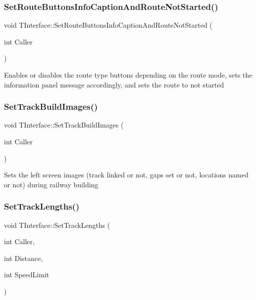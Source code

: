 \subsubsection{\texorpdfstring{Set\+Route\+Buttons\+Info\+Caption\+And\+Route\+Not\+Started()}{SetRouteButtonsInfoCaptionAndRouteNotStarted()}}
{\footnotesize\ttfamily void T\+Interface\+::\+Set\+Route\+Buttons\+Info\+Caption\+And\+Route\+Not\+Started (\begin{DoxyParamCaption}\item[{int}]{Caller }\end{DoxyParamCaption})\hspace{0.3cm}{\ttfamily [private]}}

Enables or disables the route type buttons depending on the route mode, sets the information panel message accordingly, and sets the route to \textquotesingle{}not started\textquotesingle{} \mbox{\label{class_t_interface_a5c1caa770e377ec064458f42f6301ecd}} 
\subsubsection{\texorpdfstring{Set\+Track\+Build\+Images()}{SetTrackBuildImages()}}
{\footnotesize\ttfamily void T\+Interface\+::\+Set\+Track\+Build\+Images (\begin{DoxyParamCaption}\item[{int}]{Caller }\end{DoxyParamCaption})\hspace{0.3cm}{\ttfamily [private]}}

Sets the left screen images (track linked or not, gaps set or not, locations named or not) during railway building \mbox{\label{class_t_interface_acc36eb15dae8d564e6d91f8c6596065c}} 
\subsubsection{\texorpdfstring{Set\+Track\+Lengths()}{SetTrackLengths()}}
{\footnotesize\ttfamily void T\+Interface\+::\+Set\+Track\+Lengths (\begin{DoxyParamCaption}\item[{int}]{Caller,  }\item[{int}]{Distance,  }\item[{int}]{Speed\+Limit }\end{DoxyParamCaption})\hspace{0.3cm}{\ttfamily [private]}}

